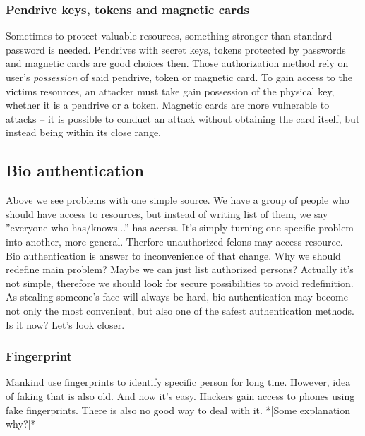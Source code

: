        \subsubsection*{Pendrive keys, tokens and magnetic cards}
            Sometimes to protect valuable resources,
            something stronger than standard password is needed. Pendrives with
            secret keys, tokens protected by passwords and magnetic cards are
            good choices then. Those authorization method rely on user's
            \textit{possession} of said pendrive, token or magnetic card. To
            gain access to the victims resources, an attacker must take gain
            possession of the physical key, whether it is a pendrive or a token.
            Magnetic cards are more vulnerable to attacks -- it is possible to
            conduct an attack without obtaining the card itself, but instead
            being within its close range.

    \subsection{Bio authentication}
        Above we see problems with one simple source.
        We have a group of people who should have access to resources,
        but instead of writing list of them, we
        say ''everyone who has/knows...'' has access.
        It's simply turning one specific problem into another,
        more general. Therfore unauthorized felons may
        access resource.\\
        Bio authentication is answer to inconvenience of that change.
        Why we should redefine main problem? Maybe we
        can just list authorized persons?
        Actually it's not simple, therefore we should
        look for secure possibilities to avoid redefinition.\\
        As stealing someone's face will always be hard,
        bio-authentication may become not only the most
        convenient, but also one of the safest
        authentication methods.\\
        Is it now? Let's look closer.

        \subsubsection*{Fingerprint}
            Mankind use fingerprints to identify specific person
            for long tine. %
            However, idea of faking that is also old. %
            And now it's easy. %
            Hackers gain access to phones
            using fake fingerprints. %
            There is also no good way
            to deal with it.
            *[Some explanation why?]* %

